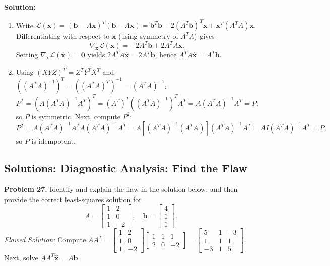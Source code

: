 \documentclass[11pt, letterpaper]{article}
\theoremstyle{definition}
\theoremstyle{remark}
\begin{document}
\textbf{Solution:}
\begin{enumerate}[label=(\alph*)]
    \item Write $\mathcal{L}(\mathbf{x}) = (\mathbf{b} - A\mathbf{x})^T(\mathbf{b} - A\mathbf{x}) = \mathbf{b}^T \mathbf{b} - 2(A^T \mathbf{b})^T \mathbf{x} + \mathbf{x}^T (A^T A)\mathbf{x}$. Differentiating with respect to $\mathbf{x}$ (using symmetry of $A^T A$) gives
    \[
    \nabla_{\mathbf{x}}\mathcal{L}(\mathbf{x}) = -2A^T \mathbf{b} + 2A^T A \mathbf{x}.
    \]
    Setting $\nabla_{\mathbf{x}}\mathcal{L}(\hat{\mathbf{x}}) = \mathbf{0}$ yields $2A^T A \hat{\mathbf{x}} = 2A^T \mathbf{b}$, hence $A^T A \hat{\mathbf{x}} = A^T \mathbf{b}$.
    \item Using $(XYZ)^T = Z^T Y^T X^T$ and $((A^T A)^{-1})^T = ((A^T A)^T)^{-1} = (A^T A)^{-1}$:
    \[
    P^T = \left(A(A^T A)^{-1} A^T\right)^T = (A^T)^T \left((A^T A)^{-1}\right)^T A^T = A(A^T A)^{-1} A^T = P,
    \]
    so $P$ is symmetric. Next, compute $P^2$:
    \[
    P^2 = A(A^T A)^{-1} A^T A (A^T A)^{-1} A^T = A \left[(A^T A)^{-1}(A^T A)\right] (A^T A)^{-1} A^T = A I (A^T A)^{-1} A^T = P,
    \]
    so $P$ is idempotent.
\end{enumerate}

\subsection{Solutions: Diagnostic Analysis: Find the Flaw}

\textbf{Problem 27.} Identify and explain the flaw in the solution below, and then provide the correct least-squares solution for
\[
A = \begin{bmatrix} 1 & 2 \\ 1 & 0 \\ 1 & -2 \end{bmatrix}, \quad \mathbf{b} = \begin{bmatrix} 4 \\ 1 \\ 1 \end{bmatrix}.
\]
\textit{Flawed Solution:} Compute $AA^T = \begin{bmatrix} 1 & 2 \\ 1 & 0 \\ 1 & -2 \end{bmatrix} \begin{bmatrix} 1 & 1 & 1 \\ 2 & 0 & -2 \end{bmatrix} = \begin{bmatrix} 5 & 1 & -3 \\ 1 & 1 & 1 \\ -3 & 1 & 5 \end{bmatrix}$. Next, solve $AA^T \hat{\mathbf{x}} = A\mathbf{b}$.
\end{document}
